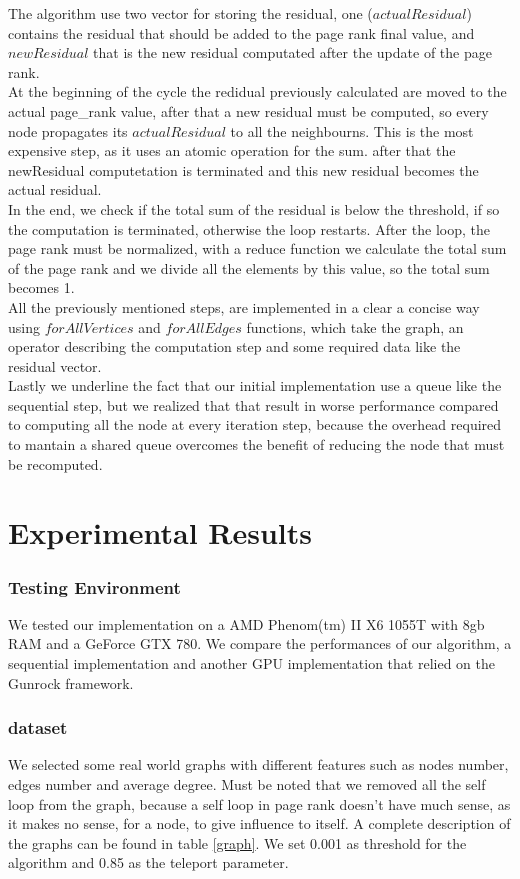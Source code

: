 \documentclass[journal]{IEEEtran}
\begin{document}
The algorithm use two vector for storing the residual, one ($actualResidual$)
contains the residual that should be added to the page rank final value,
and $newResidual$ that is the new residual computated after the update of
the page rank.\\
At the beginning of the cycle the redidual previously calculated are moved
to the actual page\_rank value, after that a new residual must be computed,
so every node propagates its $actualResidual$ to all the neighbourns. This is
the most expensive step, as it uses an atomic operation for the sum.
after that the newResidual computetation is terminated and this new residual
becomes the actual residual.\\
In the end, we check if the total sum of the residual is below the
threshold, if so the computation is terminated, otherwise the loop restarts.
After the loop, the page rank must be normalized, with a reduce function we
calculate the total sum of the page rank and we divide all the elements by
this value, so the total sum becomes 1.\\
All the previously mentioned steps, are implemented in a clear a concise
way using $forAllVertices$ and $forAllEdges$ functions, which take the graph,
an operator describing the computation step and some required data like the
residual vector.\\
Lastly we underline the fact that our initial implementation use a queue
like the sequential step, but we realized that that result in worse performance
compared to computing all the node at every iteration step, because the
overhead required to mantain a shared queue overcomes the benefit of reducing
the node that must be recomputed.


\section{Experimental Results} 
\subsubsection{Testing Environment}
We tested our implementation on a AMD Phenom(tm) II X6 1055T with 8gb RAM and 
a GeForce GTX 780.
We compare the performances of our algorithm, a sequential implementation and
another GPU implementation that relied on the Gunrock framework.
\subsubsection{dataset}
We selected some real world graphs with different features such as
nodes number, edges number and average degree.
Must be noted that we removed all the self loop from the graph, because a self
loop in page rank doesn't have much sense, as it makes no sense, for a node,
to give influence to itself.
A complete description of the graphs can be found in table \ref{graph}.
We set 0.001 as threshold for the algorithm and 0.85 as the teleport parameter.
\end{document}
